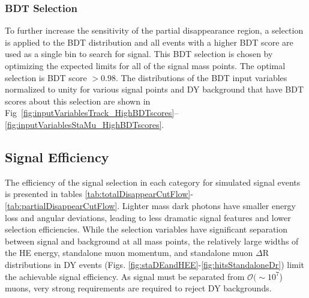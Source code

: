 \subsubsection*{BDT Selection}

To further increase the sensitivity of the partial disappearance region, a selection is applied to the BDT distribution and all events with a higher BDT score are used as a single bin to search for signal.
This BDT selection is chosen by optimizing the expected limits for all of the signal mass points.
The optimal selection is BDT score $>0.98$.
The distributions of the BDT input variables normalized to unity for various signal points and DY background that have BDT scores about this selection are shown in Fig~\ref{fig:inputVariablesTrack_HighBDTscores}--\ref{fig:inputVariablesStaMu_HighBDTscores}.
\subsection{Signal Efficiency}
The efficiency of the signal selection in each category for simulated signal events is presented in tables \ref{tab:totalDisappearCutFlow}-\ref{tab:partialDisappearCutFlow}. Lighter mass dark photons have smaller energy loss and angular deviations, leading to less dramatic signal features and lower selection efficiencies. While the selection variables have significant separation between signal and background at all mass points, the relatively large widths of the HE energy, standalone muon momentum, and standalone muon $\Delta\mathrm{R}$ distributions in DY events (Figs. \ref{fig:staDEandHEE}-\ref{fig:hitsStandaloneDr}) limit the achievable signal efficiency. As signal must be separated from $\mathcal{O}(\sim10^{7}$) muons, very strong requirements are required to reject DY backgrounds.
\begin{table}[htbp]
\label{tab:totalDisappearCutFlow}
\centering
{}
\end{table}
